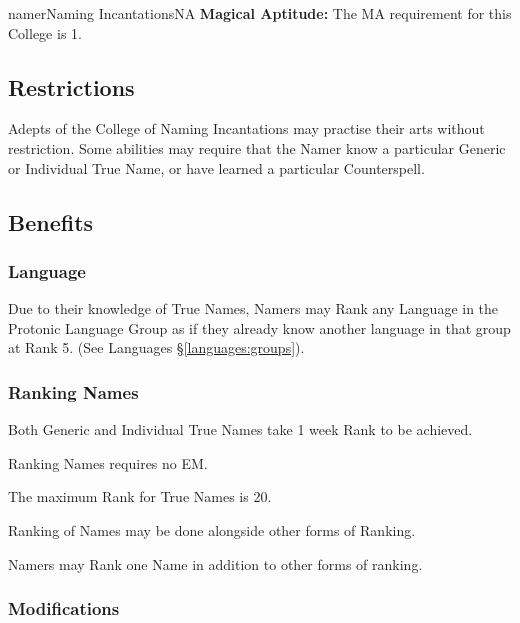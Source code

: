 \begin{college}[2.0]{namer}{Naming Incantations}{NA}
\textbf{Magical Aptitude:} The MA requirement for this College is 1.

\subsection{Restrictions}

Adepts of the College of Naming Incantations may practise their arts
without restriction. Some abilities may require that the Namer know a
particular Generic or Individual True Name, or have learned a
particular Counterspell.

\subsection{Benefits}

\subsubsection{Language}

Due to their knowledge of True Names, Namers may Rank any Language in
the Protonic Language Group as if they already know another language
in that group at Rank 5. (See Languages \S\ref{languages:groups}).

\subsubsection{Ranking Names}
\label{namer:ranking}

\begin{Itemize}
\item Both Generic and Individual True Names take 1 week \x Rank to be
achieved.

\item Ranking Names requires no EM.

\item The maximum Rank for True Names is 20.

\item Ranking of Names may be done alongside other forms of Ranking.

\item Namers may Rank one Name in addition to other forms of ranking.
\end{Itemize}

\subsubsection{Modifications}


\end{college}
